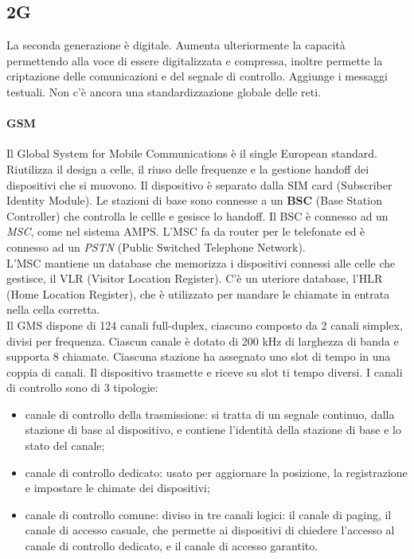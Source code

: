 \documentclass{article}
\begin{document}
\subsection{2G}
La seconda generazione è digitale. Aumenta ulteriormente la capacità permettendo
alla voce di essere digitalizzata e compressa, inoltre permette la criptazione
delle comunicazioni e del segnale di controllo. Aggiunge i messaggi testuali.
Non c'è ancora una standardizzazione globale delle reti.

\paragraph{GSM} Il Global System for Mobile Communications è il single European
standard. Riutilizza il design a celle, il riuso delle frequenze e la gestione
handoff dei dispositivi che si muovono. Il dispositivo è separato dalla SIM
card (Subscriber Identity Module). Le stazioni di base sono connesse a un
\textbf{BSC} (Base Station Controller) che controlla le cellle e gesisce lo
handoff. Il BSC è connesso ad un \textit{MSC}, come nel sistema AMPS.
L'MSC fa da router per le telefonate ed è connesso ad un \textit{PSTN}
(Public Switched Telephone Network).\\
L'MSC mantiene un database che memorizza i dispositivi connessi alle celle che
gestisce, il VLR (Visitor Location Register). C'è un uteriore database, l'HLR
(Home Location Register), che è utilizzato per mandare le chiamate in entrata
nella cella corretta.\\

Il GMS dispone di 124 canali full-duplex, ciascuno composto da 2 canali simplex,
divisi per frequenza. Ciascun canale è dotato di 200 kHz di larghezza di banda e
supporta 8 chiamate. Ciascuna stazione ha assegnato uno slot di tempo in una
coppia di canali. Il dispositivo trasmette e riceve su slot ti tempo diversi.
I canali di controllo sono di 3 tipologie:
\begin{itemize}
	\item canale di controllo della trasmissione: si tratta di un segnale continuo, dalla stazione
	      di base al dispositivo, e contiene l'identità della stazione di base e lo
	      stato del canale;

	\item canale di controllo dedicato: usato per aggiornare la posizione, la
	      registrazione e impostare le chimate dei dispositivi;

	\item canale di controllo comune: diviso in tre canali logici: il canale di
	      paging, il canale di accesso casuale, che permette ai dispositivi di
	      chiedere l'accesso al canale di controllo dedicato, e il canale di
	      accesso garantito.
\end{itemize}
\end{document}
